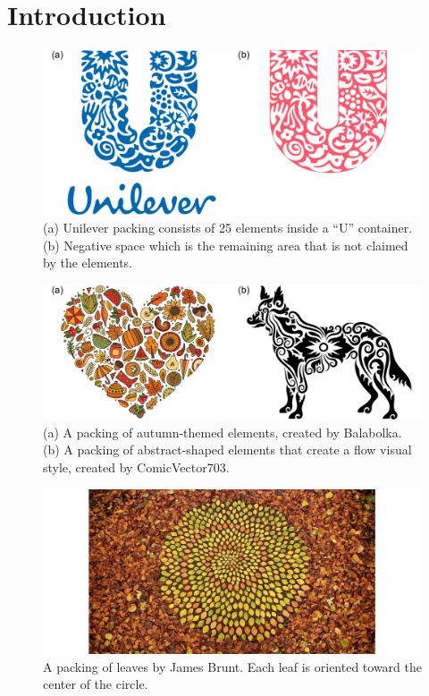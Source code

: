 
\chapter{Introduction}
\label{chapter_introduction}

\begin{figure}
\centering
\includegraphics[width=1.0\textwidth]{figures/intro/unilever_w_neg_space.pdf} 
\caption[Unilever logo]
{\label{fig_logo_packing} 
\newtext
{
(a) Unilever packing consists of 25 elements inside a ``U'' container. \newline
(b) Negative space which is the remaining area that is not claimed by the elements. 
}
}
\end{figure}

\begin{figure}
\centering
\includegraphics[width=1.0\textwidth]{figures/intro/balabolka_dog_flow.pdf} 
\caption[Packings in graphic design]
{\label{fig_graphic_designs} 
\newtext
{
(a) A packing of autumn-themed elements, created by Balabolka.
(b) A packing of abstract-shaped elements that create a flow visual style, created by ComicVector703.
}
 }
\end{figure}

\begin{figure}
\centering
\includegraphics[width=1.0\textwidth]{figures/intro/woodland.jpg} 
\caption[Packing in art]
{\label{fig_woodland} 
\newtext
{
A packing of leaves by James Brunt. Each leaf is oriented toward the center of the circle.
}
 }
\end{figure}

